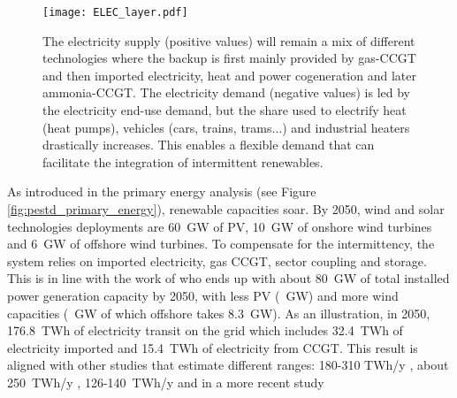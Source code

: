 \begin{figure}[!htbp]
     \centering
         \texttt{[image: ELEC\_layer.pdf]}
         \caption{The electricity supply (positive values) will remain a mix of different technologies where the backup is first mainly provided by gas-\gls{CCGT} and then imported electricity, heat and power cogeneration and later ammonia-\gls{CCGT}. The electricity demand (negative values) is led by the electricity end-use demand, but the share used to electrify heat (heat pumps), vehicles (cars, trains, trams...) and industrial heaters drastically increases. This enables a flexible demand that can facilitate the integration of intermittent renewables.}
         \label{fig:ELEC_layer}
\end{figure}

As introduced in the primary energy analysis (see Figure \ref{fig:pestd_primary_energy}), renewable capacities soar. By 2050, wind and solar technologies deployments are 60~GW of \gls{PV}, 10~GW of onshore wind turbines and 6~GW of offshore wind turbines. To compensate for the intermittency, the system relies on imported electricity, gas \gls{CCGT}, sector coupling and storage. This is in line with the work of \citet{Devogelaer2020} who ends up with about 80~GW of total installed power generation capacity by 2050, with less \gls{PV} (~GW) and more wind capacities (~GW of which offshore takes 8.3~GW). As an illustration, in 2050, 176.8~TWh of electricity transit on the grid which includes 32.4~TWh of electricity imported and 15.4~TWh of electricity from \gls{CCGT}. This result is aligned with other studies that estimate different ranges: 180-310 TWh/y \cite{Devogelaer2013}, about 250~TWh/y \cite{Devogelaer2020}, 126-140~TWh/y \cite{My2050} and in a more recent study 
